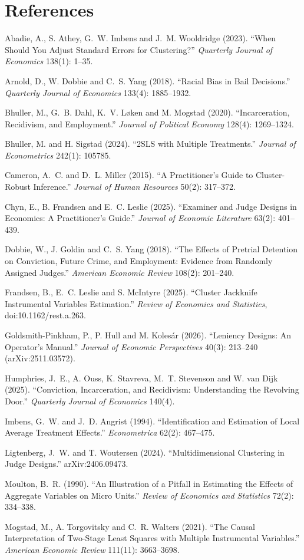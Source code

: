 \documentclass[11pt]{article}
\begin{document}
\section*{References}
\begin{description}\setlength{\itemsep}{0pt}\small\sloppy
  \item Abadie, A., S. Athey, G.~W. Imbens and J.~M. Wooldridge (2023). ``When Should You Adjust Standard Errors for Clustering?'' \emph{Quarterly Journal of Economics} 138(1): 1--35.
  \item Arnold, D., W. Dobbie and C.~S. Yang (2018). ``Racial Bias in Bail Decisions.'' \emph{Quarterly Journal of Economics} 133(4): 1885--1932.
  \item Bhuller, M., G.~B. Dahl, K.~V. Løken and M. Mogstad (2020). ``Incarceration, Recidivism, and Employment.'' \emph{Journal of Political Economy} 128(4): 1269--1324.
  \item Bhuller, M. and H. Sigstad (2024). ``2SLS with Multiple Treatments.'' \emph{Journal of Econometrics} 242(1): 105785.
  \item Cameron, A.~C. and D.~L. Miller (2015). ``A Practitioner's Guide to Cluster-Robust Inference.'' \emph{Journal of Human Resources} 50(2): 317--372.
  \item Chyn, E., B. Frandsen and E.~C. Leslie (2025). ``Examiner and Judge Designs in Economics: A Practitioner's Guide.'' \emph{Journal of Economic Literature} 63(2): 401--439.
  \item Dobbie, W., J. Goldin and C.~S. Yang (2018). ``The Effects of Pretrial Detention on Conviction, Future Crime, and Employment: Evidence from Randomly Assigned Judges.'' \emph{American Economic Review} 108(2): 201--240.
  \item Frandsen, B., E.~C. Leslie and S. McIntyre (2025). ``Cluster Jackknife Instrumental Variables Estimation.'' \emph{Review of Economics and Statistics}, doi:10.1162/rest.a.263.
  \item Goldsmith-Pinkham, P., P. Hull and M. Kolesár (2026). ``Leniency Designs: An Operator's Manual.'' \emph{Journal of Economic Perspectives} 40(3): 213--240 (arXiv:2511.03572).
  \item Humphries, J.~E., A. Ouss, K. Stavreva, M.~T. Stevenson and W. van Dijk (2025). ``Conviction, Incarceration, and Recidivism: Understanding the Revolving Door.'' \emph{Quarterly Journal of Economics} 140(4).
  \item Imbens, G.~W. and J.~D. Angrist (1994). ``Identification and Estimation of Local Average Treatment Effects.'' \emph{Econometrica} 62(2): 467--475.
  \item Ligtenberg, J.~W. and T. Woutersen (2024). ``Multidimensional Clustering in Judge Designs.'' arXiv:2406.09473.
  \item Moulton, B.~R. (1990). ``An Illustration of a Pitfall in Estimating the Effects of Aggregate Variables on Micro Units.'' \emph{Review of Economics and Statistics} 72(2): 334--338.
  \item Mogstad, M., A. Torgovitsky and C.~R. Walters (2021). ``The Causal Interpretation of Two-Stage Least Squares with Multiple Instrumental Variables.'' \emph{American Economic Review} 111(11): 3663--3698.
\end{description}
\end{document}

